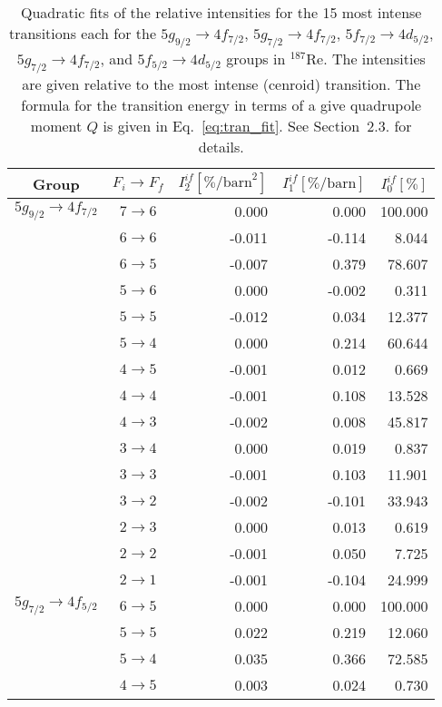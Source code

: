 %
\begin{table}[b]
\caption{\label{tab:re187intens}%
Quadratic fits of the relative intensities for the 15 most intense transitions each for the $5g_{9/2}\rightarrow4f_{7/2}$, $5g_{7/2}\rightarrow4f_{7/2}$, $5f_{7/2}\rightarrow4d_{5/2}$, $5g_{7/2}\rightarrow4f_{7/2}$, and $5f_{5/2}\rightarrow4d_{5/2}$ groups in $^{187}$Re. The intensities are given relative to the most intense (cenroid) transition. The formula for the transition energy in terms of a give quadrupole moment $Q$ is given in Eq.~\eqref{eq:tran_fit}. See Section~2.3. for details.}
\centering
\begin{tiny}
\begin{tabular}{cc|rrr}
Group& $F_i \rightarrow F_f$ & $I_2^{if} [\%\text{/barn}^2]$ & $I_1^{if} [\%\text{/barn}]$ & $I_0^{if} [\%]$\\[1pt]\hline%
$5g_{9/2} \rightarrow 4f_{7/2}$ & $7 \rightarrow 6$ &0.000&0.000&100.000\\
 & $6 \rightarrow 6$ &-0.011&-0.114&8.044\\
 & $6 \rightarrow 5$ &-0.007&0.379&78.607\\
 & $5 \rightarrow 6$ &0.000&-0.002&0.311\\
 & $5 \rightarrow 5$ &-0.012&0.034&12.377\\
 & $5 \rightarrow 4$ &0.000&0.214&60.644\\
 & $4 \rightarrow 5$ &-0.001&0.012&0.669\\
 & $4 \rightarrow 4$ &-0.001&0.108&13.528\\
 & $4 \rightarrow 3$ &-0.002&0.008&45.817\\
 & $3 \rightarrow 4$ &0.000&0.019&0.837\\
 & $3 \rightarrow 3$ &-0.001&0.103&11.901\\
 & $3 \rightarrow 2$ &-0.002&-0.101&33.943\\
 & $2 \rightarrow 3$ &0.000&0.013&0.619\\
 & $2 \rightarrow 2$ &-0.001&0.050&7.725\\
 & $2 \rightarrow 1$ &-0.001&-0.104&24.999\\[4pt]
$5g_{7/2} \rightarrow 4f_{5/2}$ & $6 \rightarrow 5$ &0.000&0.000&100.000\\
 & $5 \rightarrow 5$ &0.022&0.219&12.060\\
 & $5 \rightarrow 4$ &0.035&0.366&72.585\\
 & $4 \rightarrow 5$ &0.003&0.024&0.730\\

\end{tabular}
\end{tiny}
\end{table}
